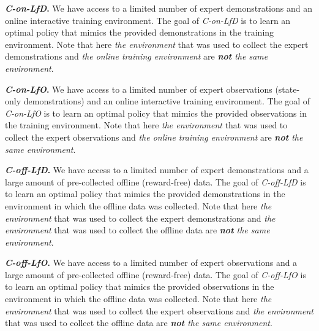 \textbf{\textit{C-on-LfD}.} 
We have access to a limited number of expert demonstrations and an online interactive training environment. 
The goal of \textit{C-on-LfD} is to learn an optimal policy that mimics the provided demonstrations in the training environment. Note that here \textit{the environment} that was used to collect the expert demonstrations and \textit{the online training environment} are \textit{\textbf{not} the same environment}. 

\textbf{\textit{C-on-LfO}.} 
We have access to a limited number of expert observations (state-only demonstrations) and an online interactive training environment. 
The goal of \textit{C-on-LfO} is to learn an optimal policy that mimics the provided observations in the training environment. Note that here \textit{the environment} that was used to collect the expert observations and \textit{the online training environment} are \textit{\textbf{not} the same environment}. 


\textbf{\textit{C-off-LfD}.} 
We have access to a limited number of expert demonstrations and a large amount of pre-collected offline (reward-free) data. 
The goal of \textit{C-off-LfD} is to learn an optimal policy that mimics the provided demonstrations in the environment in which the offline data was collected. Note that here \textit{the environment} that was used to collect the expert demonstrations and \textit{the environment} that was used to collect the offline data are \textit{\textbf{not} the same environment}. 

\textbf{\textit{C-off-LfO}.} 
We have access to a limited number of expert observations and a large amount of pre-collected offline (reward-free) data. 
The goal of \textit{C-off-LfO} is to learn an optimal policy that mimics the provided observations in the environment in which the offline data was collected. Note that here \textit{the environment} that was used to collect the expert observations and \textit{the environment} that was used to collect the offline data are \textit{\textbf{not} the same environment}. 


